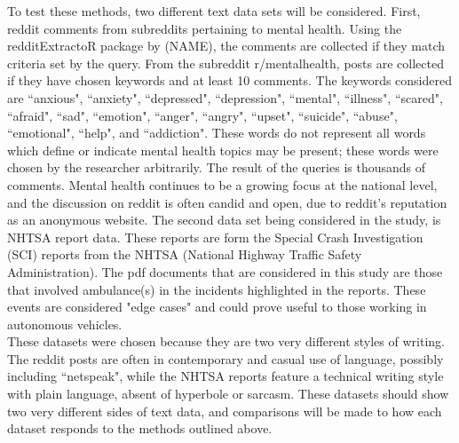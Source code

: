 To test these methods, two different text data sets will be considered. First, reddit comments from subreddits pertaining to mental health. Using the {redditExtractoR} package by (NAME), the comments are collected if they match criteria set by the query. From the subreddit r/mentalhealth, posts are collected if they have chosen keywords and at least 10 comments. The keywords considered are ``anxious", ``anxiety", ``depressed", ``depression", ``mental", ``illness", ``scared", ``afraid", ``sad", ``emotion", ``anger", ``angry", ``upset", ``suicide", ``abuse", ``emotional", ``help", and ``addiction". These words do not represent all words which define or indicate mental health topics may be present; these words were chosen by the researcher arbitrarily. The result of the queries is thousands of comments. Mental health continues to be a growing focus at the national level, and the discussion on reddit is often candid and open, due to reddit's reputation as an anonymous website. The second data set being considered in the study, is NHTSA report data. These reports are form the Special Crash Investigation (SCI) reports from the NHTSA (National Highway Traffic Safety Administration). The pdf documents that are considered in this study are those that involved ambulance(s) in the incidents highlighted in the reports. These events are considered "edge cases" and could prove useful to those working in autonomous vehicles. \\
These datasets were chosen because they are two very different styles of writing. The reddit posts are often in contemporary and casual use of language, possibly including ``netspeak", while the NHTSA reports feature a technical writing style with plain language, absent of hyperbole or sarcasm. These datasets should show two very different sides of text data, and comparisons will be made to how each dataset responds to the methods outlined above. \\